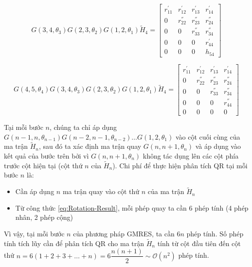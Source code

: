 \documentclass[14pt, a4paper]{article}
\numberwithin{equation}{section}
\numberwithin{algorithm}{section}
\numberwithin{figure}{section}
\numberwithin{dl}{section}
\numberwithin{md}{section}
\numberwithin{bd}{section}
\numberwithin{dn}{section}
\begin{document}
\begin{equation}
    G(3, 4, \theta_3)G(2, 3, \theta_2)G(1, 2, \theta_1) \widetilde{H}_4 = \begin{bmatrix} r_{11}^{'} & r_{12}^{'} & r_{13}^{'} & r_{14}^{'} \\
        0 & r_{22}^{''} & r_{23}^{''} & r_{24}^{''} \\
        0 & 0 & r_{33}^{''} & r_{34}^{''} \\
        0 & 0 & 0 & r_{44}^{'} \\
        0 & 0 & 0 & h_{54}  \end{bmatrix}
\end{equation}

\begin{equation}
    G(4, 5, \theta_4)G(3, 4, \theta_3)G(2, 3, \theta_2)G(1, 2, \theta_1) \widetilde{H}_4 = \begin{bmatrix} r_{11}^{'} & r_{12}^{'} & r_{13}^{'} & r_{14}^{'} \\
        0 & r_{22}^{''} & r_{23}^{''} & r_{24}^{''} \\
        0 & 0 & r_{33}^{''} & r_{34}^{''} \\
        0 & 0 & 0 & r_{44}^{''} \\
        0 & 0 & 0 & 0  \end{bmatrix}
\end{equation}

Tại mỗi bước $n$, chúng ta chỉ áp dụng $G(n-1, n, \theta_{n-1})G(n-2, n-1, \theta_{n-2})\dots G(1, 2, \theta_1)$ vào cột cuối cùng của ma trận $\widetilde{H}_n$, sau đó ta xác định ma trận quay $G(n, n+1, \theta_{n})$ và áp dụng vào kết quả của bước trên bởi vì $G(n, n+1, \theta_{n})$ không tác dụng lên các cột phía trước cột hiện tại (cột thứ $n$ của $\widetilde{H}_n$). Chi phí để thực hiện phân tích QR tại mỗi bước $n$ là:

\begin{itemize}
    \item Cần áp dụng $n$ ma trận quay vào cột thứ $n$ của ma trận $\widetilde{H}_n$
    \item Từ công thức \ref{eq:Rotation-Result}, mỗi phép quay ta cần 6 phép tính (4 phép nhân, 2 phép cộng)
\end{itemize}

Vì vậy, tại mỗi bước $n$ của phương pháp GMRES, ta cần $6n$ phép tính. Số phép tính tích lũy cần để phân tích QR cho ma trận $\widetilde{H}_n$ tính từ cột đầu tiên đến cột thứ $n=6(1+2+3+\dots+n)=6\dfrac{n(n+1)}{2}\sim \mathcal{O}(n^2)$
phép tính.
\end{document}
